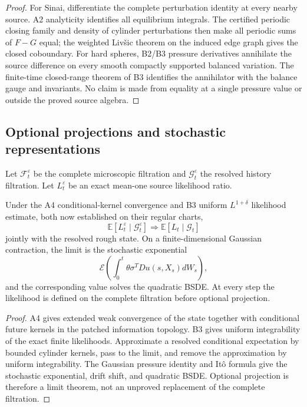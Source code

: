 \begin{proof}
For Sinai, differentiate the complete perturbation identity at every nearby
source.  A2 analyticity identifies all equilibrium integrals.  The certified
periodic closing family and density of cylinder perturbations then make all
periodic sums of \(F-G\) equal; the weighted Liv\v{s}ic theorem on the induced
edge graph gives the closed coboundary.  For hard spheres, B2/B3 pressure
derivatives annihilate the source difference on every smooth compactly
supported balanced variation.  The finite-time closed-range theorem of B3
identifies the annihilator with the balance gauge and invariants.  No claim is
made from equality at a single pressure value or outside the proved source
algebra.
\end{proof}

\subsection{Optional projections and stochastic representations}

Let \(\mathcal F_t^\varepsilon\) be the complete microscopic filtration and
\(\mathcal G_t^\varepsilon\) the resolved history filtration.  Let
\(L_t^\varepsilon\) be an exact mean-one source likelihood ratio.

\begin{theorem}
\label{thm:r16-c2-optional}
Under the A4 conditional-kernel convergence and B3 uniform
\(L^{1+\delta}\) likelihood estimate, both now established on their regular
charts,
\[
 \mathbb E[L_t^\varepsilon\mid\mathcal G_t^\varepsilon]
 \Longrightarrow
 \mathbb E[L_t\mid\mathcal G_t]
\]
jointly with the resolved rough state.  On a finite-dimensional Gaussian
contraction, the limit is the stochastic exponential
\[
 \mathcal E\left(\int_0^t\theta\sigma^TDu(s,X_s)dW_s\right),
\]
and the corresponding value solves the quadratic BSDE.  At every step the
likelihood is defined on the complete filtration before optional projection.
\end{theorem}

\begin{proof}
A4 gives extended weak convergence of the state together with conditional
future kernels in the patched information topology.  B3 gives uniform
integrability of the exact finite likelihoods.  Approximate a resolved
conditional expectation by bounded cylinder kernels, pass to the limit, and
remove the approximation by uniform integrability.  The Gaussian pressure
identity and It\^o formula give the stochastic exponential, drift shift, and
quadratic BSDE.  Optional projection is therefore a limit theorem, not an
unproved replacement of the complete filtration.
\end{proof}

